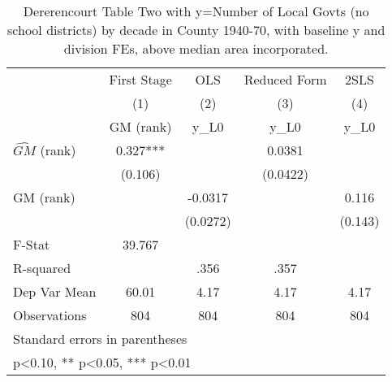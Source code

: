 \begin{table}[htbp]\centering
\def\sym#1{\ifmmode^{#1}\else\(^{#1}\)\fi}
\caption{Dererencourt Table Two with y=Number of Local Govts (no school districts) by decade in County 1940-70, with baseline y and division FEs, above median area incorporated.}
\begin{tabular}{l*{4}{c}}
\toprule
                    & First Stage   &         OLS   &Reduced Form   &        2SLS   \\
                    &\multicolumn{1}{c}{(1)}&\multicolumn{1}{c}{(2)}&\multicolumn{1}{c}{(3)}&\multicolumn{1}{c}{(4)}\\
                    &\multicolumn{1}{c}{GM  (rank)}&\multicolumn{1}{c}{y\_L0}&\multicolumn{1}{c}{y\_L0}&\multicolumn{1}{c}{y\_L0}\\
\midrule
$\hat{GM}$ (rank)   &       0.327***&               &      0.0381   &               \\
                    &     (0.106)   &               &    (0.0422)   &               \\
\addlinespace
GM  (rank)          &               &     -0.0317   &               &       0.116   \\
                    &               &    (0.0272)   &               &     (0.143)   \\
\midrule
F-Stat              &      39.767   &               &               &               \\
R-squared           &               &        .356   &        .357   &               \\
Dep Var Mean        &       60.01   &        4.17   &        4.17   &        4.17   \\
Observations        &         804   &         804   &         804   &         804   \\
\bottomrule
\multicolumn{5}{l}{\footnotesize Standard errors in parentheses}\\
\multicolumn{5}{l}{\footnotesize * p<0.10, ** p<0.05, *** p<0.01}\\
\end{tabular}
\end{table}
